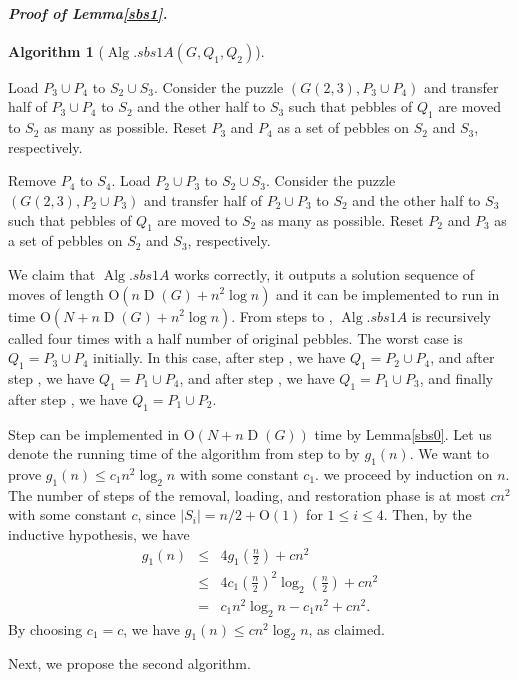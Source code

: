 \documentclass[letter,11pt]{article}
\newcommand{\white}{\qquad{\framebox{\rule{0pt}{4pt}}}}
\newcommand{\owari}{\hfill\white}
\theoremstyle{definition}
\theoremstyle{definition}
\newtheorem{alg}{Algorithm}
\DeclareMathOperator{\Alg}{Alg}
\DeclareMathOperator{\D}{D}
\newcommand{\1}{\boldmath$~1~$\unboldmath}
\newcommand{\Ord}{\mathrm{O}}
\newcommand{\qedgo}{\vspace{0.35cm}}
\newcommand{\tume}{\hspace*{0.2em}}
\newcommand{\maru}[1]{{\ooalign{\hfill$\small#1$\hfill\crcr\scalebox{1.3}{$\bigcirc$}}}}
\newenvironment{alg-enumerate}{%
  \begin{enumerate}%
   \renewcommand{\theenumi}{\arabic{enumi}}%
   \renewcommand{\labelenumi}{\rm{{\maru{\theenumi}}\tume\/}}%
   \renewcommand{\labelenumii}{\rm{$(${\maru{\theenumi}}-\theenumii$)$\tume\/}}%
 }{\end{enumerate}%
}
\newenvironment{Proofof}[1]{\expandafter
\paragraph{{\it Proof of #1.}}}{\hspace{5mm}\owari\qedgo}
\begin{document}
\begin{Proofof}{Lemma\tume\ref{sbs1}}
\begin{alg}[$\Alg.sbs1A(G, Q_1, Q_2)$]
\begin{alg-enumerate}
Load $P_3 \cup P_4$ to $S_2 \cup S_3$. 
Consider the puzzle $(G(2,3), P_3 \cup P_4)$ and transfer half of $P_3 \cup P_4$ to $S_2$ and the other half to $S_3$ such that pebbles of $Q_1$ are moved to $S_2$ as many as possible.
Reset $P_3$ and $P_4$ as a set of pebbles on $S_2$ and $S_3$, respectively.
\item Remove $P_4$ to $S_4$.
Load $P_2 \cup P_3$ to $S_2 \cup S_3$. 
Consider the puzzle $(G(2,3), P_2 \cup P_3)$ and transfer half of $P_2 \cup P_3$ to $S_2$ and the other half to $S_3$ such that pebbles of $Q_1$ are moved to $S_2$ as many as possible.
Reset $P_2$ and $P_3$ as a set of pebbles on $S_2$ and $S_3$, respectively.
\end{alg-enumerate}
\end{alg}

We claim that $\Alg.sbs1A$ works correctly, it outputs a solution sequence of moves of length $\Ord (n\D(G) + n^2 \log n) $ and it can be implemented to run in time $\Ord (N + n\D(G) + n^2 \log n)$.
From steps \maru{3} to \maru{6}, $\Alg.sbs1A$ is recursively called four times with a half number of original pebbles.
The worst case is $Q_1 = P_3 \cup P_4$ initially.
In this case, after step \maru{3}, we have $Q_1 = P_2 \cup P_4$, and after step \maru{4}, we have $Q_1 = P_1 \cup P_4$, and after step \maru{5}, we have $Q_1 = P_1 \cup P_3$, and finally after step \maru{6}, we have $Q_1 = P_1 \cup P_2$.

Step \maru{2} can be implemented in $\Ord(N+n\D(G))$ time by Lemma\tume\ref{sbs0}.
Let us denote the running time of the algorithm from step \maru{3} to \maru{6} by $g_1(n)$.
We want to prove $g_1(n) \le c_1 n^2 \log_2 n$ with some constant $c_1$.
we proceed by induction on $n$.
The number of steps of the removal, loading, and restoration phase is at most $cn^2$ with some constant $c$, since $|S_i| = n/2 + \Ord (1)$ for $1 \le i \le 4$.
Then, by the inductive hypothesis, we have
\begin{eqnarray*}
g_1(n) & \le & 4 g_1(\frac{n}{2}) + c n^2 \\
 & \le & 4 c_1 (\frac{n}{2})^2 \log_2 (\frac{n}{2}) + c n^2 \\
 & = & c_1 n^2 \log_2 n - c_1 n^2 + c n^2.
\end{eqnarray*} 
By choosing $c_1 = c$, we have $g_1(n) \le c n^2 \log_2 n$, as claimed.

Next, we propose the second algorithm. 


\end{Proofof}
\end{document}
